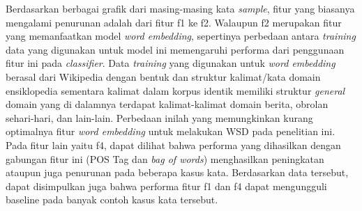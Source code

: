 Berdasarkan berbagai grafik dari masing-masing kata \textit{sample}, fitur yang biasanya mengalami penurunan adalah dari fitur f1 ke f2. Walaupun f2 merupakan fitur yang memanfaatkan model \textit{word embedding}, sepertinya perbedaan antara \textit{training} data yang digunakan untuk model ini memengaruhi performa dari penggunaan fitur ini pada \textit{classifier}. Data \textit{training} yang digunakan untuk \textit{word embedding} berasal dari Wikipedia dengan bentuk dan struktur kalimat/kata domain ensiklopedia sementara kalimat dalam korpus identik memiliki struktur \textit{general} domain yang di dalamnya terdapat kalimat-kalimat domain berita, obrolan sehari-hari, dan lain-lain. Perbedaan inilah yang memungkinkan kurang optimalnya fitur \textit{word embedding} untuk melakukan WSD pada penelitian ini. Pada fitur lain yaitu f4, dapat dilihat bahwa performa yang dihasilkan dengan gabungan fitur ini (POS Tag dan \textit{bag of words}) menghasilkan peningkatan ataupun juga penurunan pada beberapa kasus kata. Berdasarkan data tersebut, dapat disimpulkan juga bahwa performa fitur f1 dan f4 dapat mengungguli baseline pada banyak contoh kasus kata tersebut.